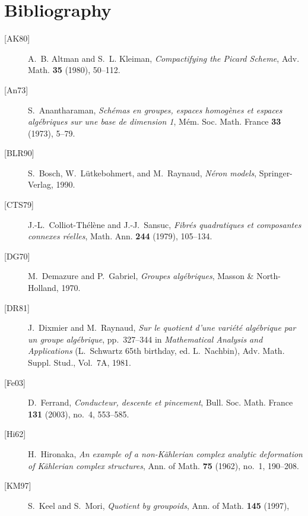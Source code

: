 \section*{Bibliography\protect\footnotemark}
\label{sec:sga3-V-bibliography}

\begin{description}
\item[{[AK80]}]\label{bib:sga3-V-AK80} A.~B. Altman and S.~L. Kleiman,
  \emph{Compactifying the Picard Scheme}, Adv. Math. \textbf{35}
  (1980), 50--112.
\item[{[An73]}]\label{bib:sga3-V-An73} S.~Anantharaman,
  \emph{Sch\'emas en groupes, espaces homog\`enes et espaces
  alg\'ebriques sur une base de dimension 1}, M\'em. Soc. Math.
  France \textbf{33} (1973), 5--79.
\item[{[BLR90]}]\label{bib:sga3-V-BLR90} S.~Bosch, W.~L\"utkebohmert, and M.~Raynaud,
  \emph{N\'eron models}, Springer-Verlag, 1990.
\item[{[CTS79]}]\label{bib:sga3-V-CTS79} J.-L.~Colliot-Th\'el\`ene and J.-J.~Sansuc,
  \emph{Fibr\'es quadratiques et composantes connexes r\'eelles},
  Math. Ann. \textbf{244} (1979), 105--134.
\item[{[DG70]}]\label{bib:sga3-V-DG70} M.~Demazure and P.~Gabriel,
  \emph{Groupes alg\'ebriques}, Masson \& North-Holland, 1970.
\item[{[DR81]}]\label{bib:sga3-V-DR81} J.~Dixmier and M.~Raynaud,
  \emph{Sur le quotient d'une vari\'et\'e alg\'ebrique par un groupe
  alg\'ebrique}, pp.~327--344 in \emph{Mathematical Analysis and
  Applications} (L.~Schwartz 65th birthday, ed. L.~Nachbin), Adv.
  Math. Suppl. Stud., Vol.~7A, 1981.
\item[{[Fe03]}]\label{bib:sga3-V-Fe03} D.~Ferrand,
  \emph{Conducteur, descente et pincement}, Bull. Soc. Math. France
  \textbf{131} (2003), no.~4, 553--585.
\item[{[Hi62]}]\label{bib:sga3-V-Hi62} H.~Hironaka,
  \emph{An example of a non-K\"ahlerian complex analytic deformation
  of K\"ahlerian complex structures}, Ann. of Math. \textbf{75}
  (1962), no.~1, 190--208.
\item[{[KM97]}]\label{bib:sga3-V-KM97} S.~Keel and S.~Mori,
  \emph{Quotient by groupoids}, Ann. of Math. \textbf{145} (1997),

\end{description}
